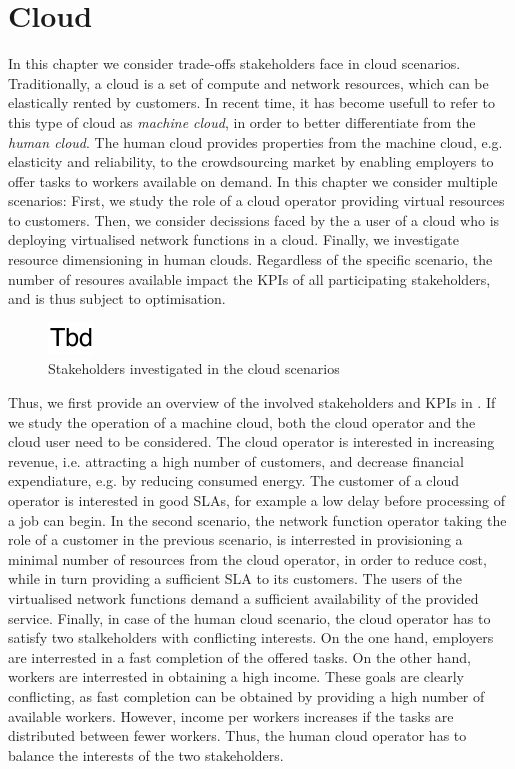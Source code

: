 \chapter{Cloud}\label{chap:cloud}

In this chapter we consider trade-offs stakeholders face in cloud scenarios.
Traditionally, a cloud is a set of compute and network resources, which can be elastically rented by customers.
In recent time, it has become usefull to refer to this type of cloud as \emph{machine cloud}, in order to better differentiate from the \emph{human cloud}.
The human cloud provides properties from the machine cloud, e.g. elasticity and reliability, to the crowdsourcing market by enabling employers to offer tasks to workers available on demand.
In this chapter we consider multiple scenarios:
First, we study the role of a cloud operator providing virtual resources to customers.
Then, we consider decissions faced by the a user of a cloud who is deploying virtualised network functions in a cloud.
Finally, we investigate resource dimensioning in human clouds.
Regardless of the specific scenario, the number of resoures available impact the \glspl{KPI} of all participating stakeholders, and is thus subject to optimisation.

\begin{figure}
  \centering
  \includegraphics{cloud/figures/model}
  \caption{Stakeholders investigated in the cloud scenarios}
  \label{fig:cloud:model}
\end{figure}

Thus, we first provide an overview of the involved stakeholders and \glspl{KPI} in .
If we study the operation of a machine cloud, both the cloud operator and the cloud user need to be considered.
The cloud operator is interested in increasing revenue, i.e. attracting a high number of customers, and decrease financial expendiature, e.g. by reducing consumed energy.
The customer of a cloud operator is interested in good \glspl{SLA}, for example a low delay before processing of a job can begin.
In the second scenario, the network function operator taking the role of a customer in the previous scenario, is interrested in provisioning a minimal number of resources from the cloud operator, in order to reduce cost, while in turn providing a sufficient \gls{SLA} to its customers.
The users of the virtualised network functions demand a sufficient availability of the provided service.
Finally, in case of the human cloud scenario, the cloud operator has to satisfy two stalkeholders with conflicting interests.
On the one hand, employers are interrested in a fast completion of the offered tasks.
On the other hand, workers are interrested in obtaining a high income.
These goals are clearly conflicting, as fast completion can be obtained by providing a high number of available workers.
However, income per workers increases if the tasks are distributed between fewer workers.
Thus, the human cloud operator has to balance the interests of the two stakeholders.

